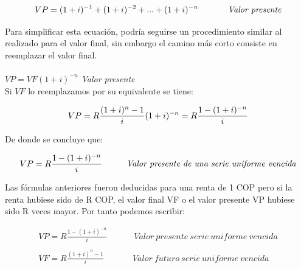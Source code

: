 	\begin{equation*}
		VP=(1+i)^{-1}+(1+i)^{-2}+...+(1+i)^{-n} \hspace{35pt} \textit{Valor presente} \\
	\end{equation*}

	Para simplificar esta ecuación, podría seguirse un procedimiento similar al realizado para el valor final, sin embargo el camino más corto consiste en reemplazar el valor final.
	\\\\
$VP=VF(1+i)^{-n}$ \hspace{35pt} \textit{Valor presente} \\


	Si $VF$ lo reemplazamos por su equivalente se tiene:

	\begin{equation*}
		VP = R\frac{(1+i)^{n}-1}{i} (1+i)^{-n} = R\frac{1-(1+i)^{-n}}{i}\\
	\end{equation*}

	De donde se concluye que:

	\begin{equation*}
		VP = R\frac{1-(1+i)^{-n}}{i} \hspace{25pt} \textit{  Valor presente de una serie uniforme vencida} \\
	\end{equation*}

	Las fórmulas anteriores fueron deducidas para una renta de 1 COP pero si la renta hubiese sido de R COP, el valor final VF o el valor presente VP hubiese sido R veces mayor. Por tanto podemos escribir:

	\begin{align*}
		VP=R \frac{1-(1+i)^{-n}}{i}\hspace{35pt}\ Valor\ presente\ serie\ uniforme \ vencida
		\\\\
		VF=R \frac{(1+i)^{n}-1}{i}\ \hspace{35pt}\ Valor\ futuro\ serie\ uniforme\ vencida
	\end{align*}
	\\
	\\\\

	

	

	

